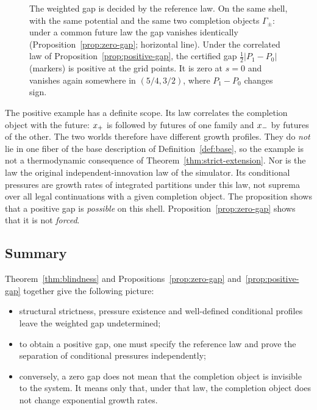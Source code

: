 \begin{figure}[t]
\centering

\caption{The weighted gap is decided by the reference law. On the same shell, with the same potential and the same two completion objects $\Gamma_\pm$: under a common future law the gap vanishes identically (Proposition~\ref{prop:zero-gap}; horizontal line). Under the correlated law of Proposition~\ref{prop:positive-gap}, the certified gap $\tfrac12|P_1-P_0|$ (markers) is positive at the grid points. It is zero at $s=0$ and vanishes again somewhere in $(5/4,3/2)$, where $P_1-P_0$ changes sign.}
\label{fig:gap}
\end{figure}

The positive example has a definite scope. Its law correlates the completion object with the future: $x_{+}$ is followed by futures of one family and $x_{-}$ by futures of the other. The two worlds therefore have different growth profiles. They do \emph{not} lie in one fiber of the base description of Definition~\ref{def:base}, so the example is not a thermodynamic consequence of Theorem~\ref{thm:strict-extension}. Nor is the law the original independent-innovation law of the simulator. Its conditional pressures are growth rates of integrated partitions under this law, not suprema over all legal continuations with a given completion object. The proposition shows that a positive gap is \emph{possible} on this shell. Proposition~\ref{prop:zero-gap} shows that it is not \emph{forced}.

\subsection{Summary}

Theorem~\ref{thm:blindness} and Propositions~\ref{prop:zero-gap} and~\ref{prop:positive-gap} together give the following picture:
\begin{itemize}
  \item structural strictness, pressure existence and well-defined conditional profiles leave the weighted gap undetermined;
  \item to obtain a positive gap, one must specify the reference law and prove the separation of conditional pressures independently;
  \item conversely, a zero gap does not mean that the completion object is invisible to the system. It means only that, under that law, the completion object does not change exponential growth rates.
\end{itemize}
